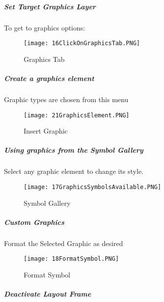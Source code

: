 \clearpage

\subparagraph{Set Target Graphics Layer}

To get to graphics options:



 
\begin{figure}[h!]
 \centering
     \texttt{[image: 16ClickOnGraphicsTab.PNG]}
 \caption{Graphics Tab}


 \end{figure} 


\clearpage

\subparagraph{Create a graphics element}



\noindent Graphic types are chosen from this menu

 
\begin{figure}[h!]
 \centering
     \texttt{[image: 21GraphicsElement.PNG]}
 \caption{Insert Graphic}


 \end{figure} 
\clearpage

\subparagraph{Using graphics from the Symbol Gallery}

\noindent Select any graphic element to change its style.


\begin{figure}[h!]
 \centering
     \texttt{[image: 17GraphicsSymbolsAvailable.PNG]}
 \caption{Symbol Gallery}


 \end{figure} 



\clearpage


\subparagraph{Custom Graphics}
Format the Selected Graphic as desired  


\begin{figure}[h!]
 \centering
     \texttt{[image: 18FormatSymbol.PNG]}
 \caption{Format Symbol}


 \end{figure} 



\clearpage




\subparagraph{Deactivate Layout Frame}

